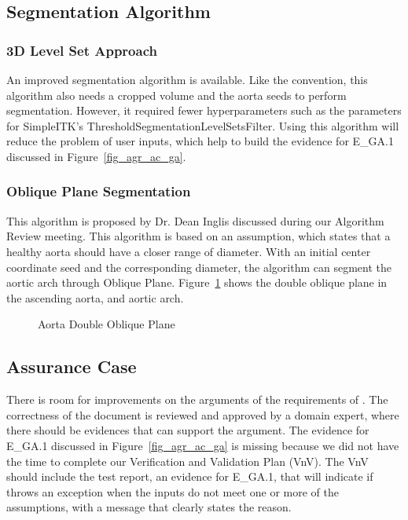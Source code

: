 \subsection{Segmentation Algorithm}

\subsubsection{3D Level Set Approach}
An improved segmentation algorithm \cite{6346433} is available. Like the convention, this algorithm also needs a cropped volume and the aorta seeds to perform segmentation. However, it required fewer hyperparameters such as the parameters for SimpleITK's ThresholdSegmentationLevelSetsFilter. Using this algorithm will reduce the problem of user inputs, which help to build the evidence for E\_GA.1 discussed in Figure~\ref{fig_agr_ac_ga}.

\subsubsection{Oblique Plane Segmentation}
This algorithm is proposed by Dr. Dean Inglis discussed during our Algorithm Review meeting. This algorithm is based on an assumption, which states that a healthy aorta should have a closer range of diameter. With an initial center coordinate seed and the corresponding diameter, the algorithm can segment the aortic arch through Oblique Plane. Figure~\ref{fig_oblique} shows the double oblique plane in the ascending aorta, and aortic arch.

\begin{figure}[H]
    \centering
    \caption[Aorta Double Oblique Plane]{Aorta Double Oblique Plane}
    \label{fig_oblique}
\end{figure}

\subsection{Assurance Case}

There is room for improvements on the arguments of the requirements of \progname{}. The correctness of the document is reviewed and approved by a domain expert, where there should be evidences that can support the argument. The evidence for  E\_GA.1 discussed in Figure~\ref{fig_agr_ac_ga} is missing because we did not have the time to complete our Verification and Validation Plan (VnV). The VnV should include the test report, an evidence for E\_GA.1, that will indicate if \progname{} throws an exception when the inputs do not meet one or more of the assumptions, with a message that clearly states the reason.